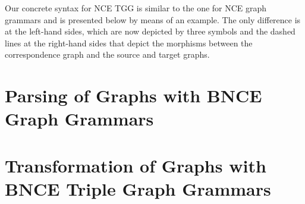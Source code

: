 \documentclass[]{report}
\begin{document}
Our concrete syntax for NCE TGG is similar to the one for NCE graph grammars and is presented below by means of an example. The only difference is at the left-hand sides, which are now depicted by three symbols and the dashed lines at the right-hand sides that depict the morphisms between the correspondence graph and the source and target graphs.


%


\section{Parsing of Graphs with BNCE Graph Grammars}


\section{Transformation of Graphs with BNCE Triple Graph Grammars}
\end{document}
